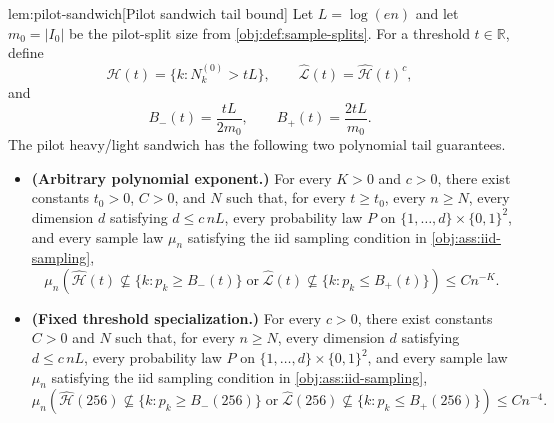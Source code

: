 \documentclass[11pt]{article}
\begin{document}
\begin{lemmav}{lem:pilot-sandwich}[Pilot sandwich tail bound]
Let \(L=\log(en)\) and let \(m_0=|I_0|\) be the pilot-split size from \cref{obj:def:sample-splits}.  For a threshold \(t\in\mathbb R\), define
\[
\widehat{\mathcal H}(t)=\{k:N_k^{(0)}>tL\},\qquad
\widehat{\mathcal L}(t)=\widehat{\mathcal H}(t)^c,
\]
and
\[
B_-(t)=\frac{tL}{2m_0},\qquad
B_+(t)=\frac{2tL}{m_0}.
\]
The pilot heavy/light sandwich has the following two polynomial tail guarantees.
\begin{itemize}
\item \textbf{(Arbitrary polynomial exponent.)} For every \(K>0\) and \(c>0\), there exist constants \(t_0>0\), \(C>0\), and \(N\) such that, for every \(t\ge t_0\), every \(n\ge N\), every dimension \(d\) satisfying \(d\le c\,nL\), every probability law \(P\) on \(\{1,\ldots,d\}\times\{0,1\}^2\), and every sample law \(\mu_n\) satisfying the iid sampling condition in \cref{obj:ass:iid-sampling},
\[
\mu_n\!\left(
\widehat{\mathcal H}(t)\not\subseteq\{k:p_k\ge B_-(t)\}
\;\text{or}\;
\widehat{\mathcal L}(t)\not\subseteq\{k:p_k\le B_+(t)\}
\right)
\le C n^{-K}.
\]
\item \textbf{(Fixed threshold specialization.)} For every \(c>0\), there exist constants \(C>0\) and \(N\) such that, for every \(n\ge N\), every dimension \(d\) satisfying \(d\le c\,nL\), every probability law \(P\) on \(\{1,\ldots,d\}\times\{0,1\}^2\), and every sample law \(\mu_n\) satisfying the iid sampling condition in \cref{obj:ass:iid-sampling},
\[
\mu_n\!\left(
\widehat{\mathcal H}(256)\not\subseteq\{k:p_k\ge B_-(256)\}
\;\text{or}\;
\widehat{\mathcal L}(256)\not\subseteq\{k:p_k\le B_+(256)\}
\right)
\le C n^{-4}.
\]
\end{itemize}
\end{lemmav}
\end{document}

